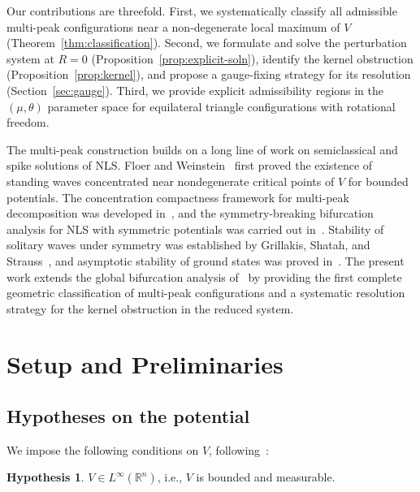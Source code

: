 \documentclass[11pt]{article}
\theoremstyle{plain}%
\theoremstyle{definition}%
\theoremstyle{definition}%
\newtheorem{hyp}{Hypothesis}%
\theoremstyle{remark}%
\numberwithin{equation}{section}
\newcommand{\R}{\mathbb{R}}
\begin{document}
Our contributions are threefold. First, we systematically classify all admissible multi-peak configurations near a non-degenerate local maximum of $V$ (Theorem~\ref{thm:classification}). Second, we formulate and solve the perturbation system at $R=0$ (Proposition~\ref{prop:explicit-soln}), identify the kernel obstruction (Proposition~\ref{prop:kernel}), and propose a gauge-fixing strategy for its resolution (Section~\ref{sec:gauge}). Third, we provide explicit admissibility regions in the $(\mu,\theta)$ parameter space for equilateral triangle configurations with rotational freedom.

The multi-peak construction builds on a long line of work on semiclassical and spike solutions of NLS. Floer and Weinstein~\cite{FloerWeinstein1986} first proved the existence of standing waves concentrated near nondegenerate critical points of $V$ for bounded potentials. The concentration compactness framework for multi-peak decomposition was developed in~\cite{Lions1984a,Lions1984b}, and the symmetry-breaking bifurcation analysis for NLS with symmetric potentials was carried out in~\cite{KirrKevrekidisPelinovsky2011}. Stability of solitary waves under symmetry was established by Grillakis, Shatah, and Strauss~\cite{GrillakisShatahStrauss1987,GrillakisShatahStrauss1990}, and asymptotic stability of ground states was proved in~\cite{KirrZarnescu2007,KirrMizrak2008}. The present work extends the global bifurcation analysis of~\cite{KirrNatarajan2018} by providing the first complete geometric classification of multi-peak configurations and a systematic resolution strategy for the kernel obstruction in the reduced system.


\section{Setup and Preliminaries}\label{sec:setup}

\subsection{Hypotheses on the potential}\label{subsec:hypotheses}

We impose the following conditions on $V$, following~\cite{KirrKevrekidisPelinovsky2011,FloerWeinstein1986,KirrNatarajan2018}:

\begin{hyp}\label{hyp:V1}
$V\in L^\infty(\R^n)$, i.e., $V$ is bounded and measurable.
\end{hyp}
\end{document}
